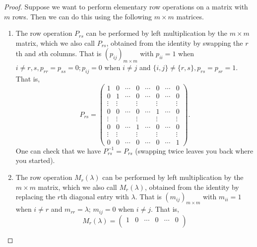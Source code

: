 \documentclass[10pt, a4paper]{article}
\begin{document}
\begin{theorem}[continues = thm:lintoech]
    \begin{proof}
        Suppose we want to perform elementary row operations on a matrix with $m$ rows.
        Then we can do this using the following $m \times m$ matrices.
        \begin{enumerate}[label = (\alph*)]
            \item The row operation $P_{rs}$ can be performed by left multiplication by the $m \times m$ matrix,
            which we also call $P_{rs}$,
            obtained from the identity by swapping the $r$th and $s$th columns.
            That is $(p_{ij})_{m \times m}$ with $p_{ii} = 1$ when $i \neq r, s, p_{rr} = p_{ss} = 0; p_{ij} = 0$ when $i \neq j$ and $\{i, j\} \neq \{r, s\}, p_{rs} = p_{sr} = 1$. That is,
            \[
            P_{rs} = \begin{pmatrix}
                1 & 0 & \dotsi & 0 & \dotsi & 0 & \dotsi & 0 \\
                0 & 1 & \dotsi & 0 & \dotsi & 0 & \dotsi & 0 \\
                \vdots & \vdots & \phantom{} & \vdots & \phantom{} & \vdots & \phantom{} & \vdots \\
                0 & 0 & \dotsi & 0 & \dotsi & 1 & \dotsi & 0 \\
                \vdots & \vdots & \phantom{} & \vdots & \phantom{} & \vdots & \phantom{} & \vdots \\
                0 & 0 & \dotsi & 1 & \dotsi & 0 & \dotsi & 0 \\
                \vdots & \vdots & \phantom{} & \vdots & \phantom{} & \vdots & \phantom{} & \vdots \\
                0 & 0 & \dotsi & 0 & \dotsi & 0 & \dotsi & 1
            \end{pmatrix}.
            \]
            One can check that we have $P_{rs} ^ {-1} = P_{rs}$ (swapping twice leaves you back where you started).
            \item
            The row operation $M_r(\lambda)$ can be performed by left multiplication by the $m \times m$ matrix,
            which we also call $M_r(\lambda)$,
            obtained from the identity by replacing the $r$th diagonal entry with $\lambda$.
            That is $(m_{ij})_{m \times m}$ with $m_{ii} = 1$ when $i \neq r$ and $m_{rr} = \lambda$; $m_{ij} = 0$ when $i \neq j$.
            That is,
            \[
            M_r(\lambda) = \begin{pmatrix}
                1 & 0 & \dotsi & 0 & \dotsi & 0 \\

\end{pmatrix}\]
\end{enumerate}
\end{proof}
\end{theorem}
\end{document}
